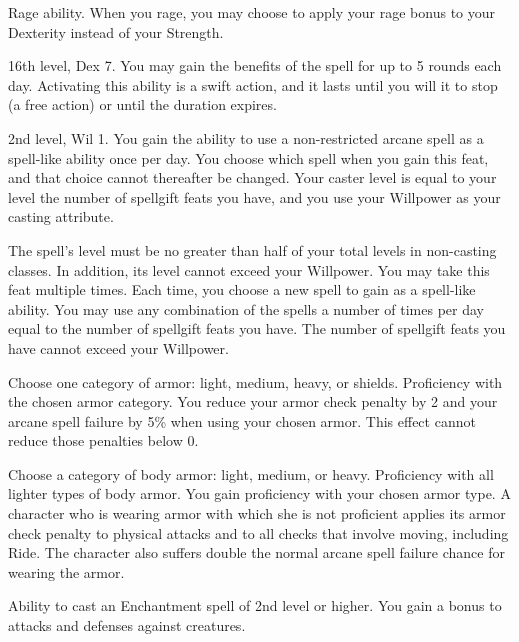 \featpre Rage ability.
\featben When you rage, you may choose to apply your rage bonus to your Dexterity instead of your Strength.

\featpres 16th level, Dex 7.
\featben You may gain the benefits of the 
spell for up to 5 rounds each day.
Activating this ability is a swift action, and it lasts until you will it to stop (a free action) or until the duration expires.

\featpres 2nd level, Wil 1.
\featben You gain the ability to use a non-restricted arcane spell as a spell-like ability once per day.
You choose which spell when you gain this feat, and that choice cannot thereafter be changed.
Your caster level is equal to your level \add the number of spellgift feats you have, and you use your Willpower as your casting attribute.

The spell's level must be no greater than half of your total levels in non-casting classes.
In addition, its level cannot exceed your Willpower.
You may take this feat multiple times.
Each time, you choose a new spell to gain as a spell-like ability.
You may use any combination of the spells a number of times per day equal to the number of spellgift feats you have.
The number of spellgift feats you have cannot exceed your Willpower.

Choose one category of armor: light, medium, heavy, or shields.
\featpre Proficiency with the chosen armor category.
\featben You reduce your armor check penalty by 2 and your arcane spell failure by 5\% when using your chosen armor.
This effect cannot reduce those penalties below 0.

Choose a category of body armor: light, medium, or heavy.
\featpre Proficiency with all lighter types of body armor.
\featben You gain proficiency with your chosen armor type.
A character who is wearing armor with which she is not proficient applies its armor check penalty to physical attacks and to all checks that involve moving, including Ride.
The character also suffers double the normal arcane spell failure chance for wearing the armor.

\featpre Ability to cast an Enchantment spell of 2nd level or higher.
\featben You gain a  bonus to attacks and defenses against \bewildered creatures.
\featspecial \featbanenotes


